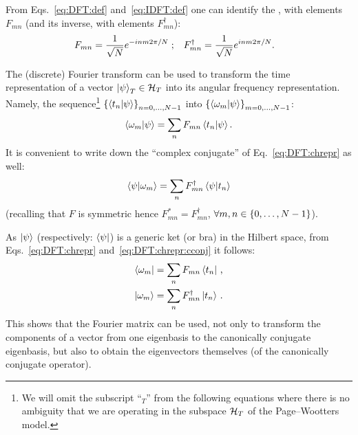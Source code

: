 From Eqs.~\eqref{eq:DFT:def} and~\eqref{eq:IDFT:def} one can identify the
, with elements $F_{mn}$
(and its inverse,
with elements $F_{mn}^{\dagger}$):
\begin{align}\label{eq:pw:F_mn:def}
  F_{mn}            &= \frac{1}{\sqrt{N}} e^{-i n m 2 \pi / N} \;\text{;} &
  F_{mn}^{\dagger}  &= \frac{1}{\sqrt{N}} e^{ i n m 2 \pi / N}
  \text{.}
\end{align}


The (discrete) Fourier transform can be used to transform the time representation
of a vector $\ket{\psi}_T \in \mathcal{H}_T$ into its angular frequency representation.
Namely, the sequence\footnote{
  We will omit the subscript ``${}_{T}$'' from the following equations
  where there is no ambiguity that
  we are operating in the subspace $\mathcal{H}_T$
  of the Page--Wootters model.
}
$\left\{\braket{t_n}{\psi}\right\}_{n=0, \dots, N-1}$ into
$\left\{\braket{\omega_m}{\psi}\right\}_{m=0, \dots, N-1}$:
\begin{equation}\label{eq:DFT:chrepr}
  \braket{\omega_{m}}{\psi} = \sum_n F_{mn} \braket{t_n}{\psi} \text{.}
\end{equation}
It is convenient to write down the ``complex conjugate'' of Eq.~\eqref{eq:DFT:chrepr} as well:
\begin{equation}\label{eq:DFT:chrepr:cconj}
  \braket{\psi}{\omega_{m}} = \sum_n F_{mn}^{\dagger} \braket{\psi}{t_n}
\end{equation}
(recalling that $F$ is symmetric hence
$F_{mn}^{*} = F_{mn}^{\dagger}$,
$\forall m,n \in \left\{0, \dots, N-1\right\}$).

As $\ket{\psi}$ (respectively: $\bra{\psi}$) is a generic ket (or bra) in the Hilbert space,
from Eqs.~\eqref{eq:DFT:chrepr} and~\eqref{eq:DFT:chrepr:cconj} it follows:
\begin{align}
  \label{eq:DFT:bra}  \bra{\omega_{m}} &= \sum_n F_{mn}           \bra{t_n} \,\text{,}  \\
  \label{eq:DFT:ket}  \ket{\omega_{m}} &= \sum_n F_{mn}^{\dagger} \ket{t_n} \,\text{.}
\end{align}
This shows that the Fourier matrix can be used, not only to transform the components
of a vector from one eigenbasis to the canonically conjugate eigenbasis,
but also to obtain the eigenvectors themselves (of the canonically conjugate operator).

